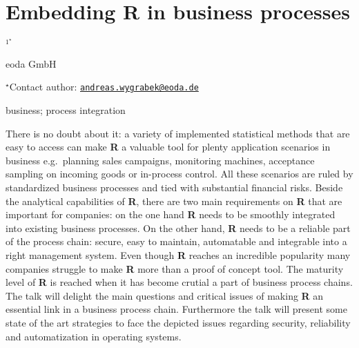 \documentclass[\main/boa.tex]{subfiles}
\begin{document}
\section{Embedding R in business processes}

\begin{center}
  {\bf {}$^{1^\star}$}
\end{center}

\vskip 0.3cm

\begin{affiliations}
\begin{enumerate}
\begin{minipage}{0.915\textwidth}
\centering
\item eoda GmbH \\[-2pt]
\end{minipage}
\end{enumerate}
$^\star$Contact author: \href{mailto:andreas.wygrabek@eoda.de}{\nolinkurl{andreas.wygrabek@eoda.de}}\\
\end{affiliations}

\vskip 0.5cm

\begin{minipage}{0.915\textwidth}
\keywords business; process integration
\end{minipage}

\vskip 0.8cm

There is no doubt about it: a variety of implemented statistical methods
that are easy to access can make \textbf{R} a valuable tool for plenty
application scenarios in business e.g.~planning sales campaigns,
monitoring machines, acceptance sampling on incoming goods or in-process
control. All these scenarios are ruled by standardized business
processes and tied with substantial financial risks. Beside the
analytical capabilities of \textbf{R}, there are two main requirements
on \textbf{R} that are important for companies: on the one hand
\textbf{R} needs to be smoothly integrated into existing business
processes. On the other hand, \textbf{R} needs to be a reliable part of
the process chain: secure, easy to maintain, automatable and integrable
into a right management system. Even though \textbf{R} reaches an
incredible popularity many companies struggle to make \textbf{R} more
than a proof of concept tool. The maturity level of \textbf{R} is
reached when it has become crutial a part of business process chains.
The talk will delight the main questions and critical issues of making
\textbf{R} an essential link in a business process chain. Furthermore
the talk will present some state of the art strategies to face the
depicted issues regarding security, reliability and automatization in
operating systems.
\end{document}
